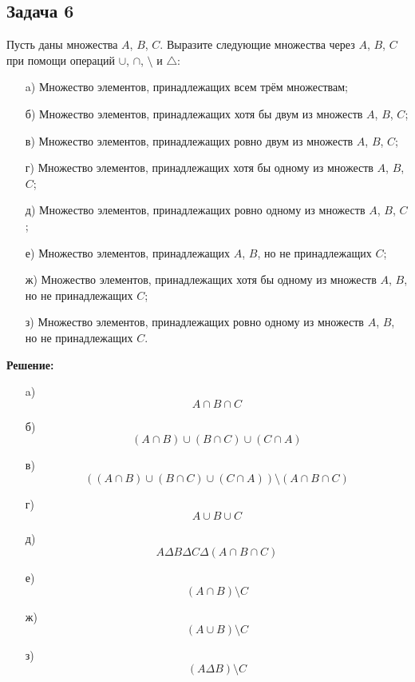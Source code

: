 \documentclass[a4paper,12pt]{article}
\begin{document}
\subsection{Задача 6}
Пусть даны множества \(A\), \(B\), \(C\). Выразите следующие множества через \(A\), \(B\), \(C\) при помощи операций \(\cup\), \(\cap\), \(\setminus\) и \(\triangle\):
\begin{itemize}
    \item[a)] Множество элементов, принадлежащих всем трём множествам;
    \item[б)] Множество элементов, принадлежащих хотя бы двум из множеств \(A\), \(B\), \(C\);
    \item[в)] Множество элементов, принадлежащих ровно двум из множеств \(A\), \(B\), \(C\);
    \item[г)] Множество элементов, принадлежащих хотя бы одному из множеств \(A\), \(B\), \(C\);
    \item[д)] Множество элементов, принадлежащих ровно одному из множеств \(A\), \(B\), \(C\);
    \item[е)] Множество элементов, принадлежащих \(A\), \(B\), но не принадлежащих \(C\);
    \item[ж)] Множество элементов, принадлежащих хотя бы одному из множеств \(A\), \(B\), но не принадлежащих \(C\);
    \item[з)] Множество элементов, принадлежащих ровно одному из множеств \(A\), \(B\), но не принадлежащих \(C\).
\end{itemize}

\textbf{Решение:}
\begin{itemize}
    \item[a)] 
    \[
    A\cap B\cap C
    \]
    
    \item[б)] 
    \[
    (A \cap B) \cup (B \cap C) \cup (C \cap A)
    \]
    
    \item[в)] 
    \[
    ((A \cap B) \cup (B \cap C) \cup (C \cap A)) \setminus (A\cap B\cap C)
    \]
    
    \item[г)] 
    \[
    A\cup B\cup C
    \]
    
    \item[д)] 
    \[
    A \Delta B \Delta C \Delta(A\cap B\cap C)
    \]
    
    \item[е)] 
    \[
    (A\cap B) \setminus C
    \]
    
    \item[ж)] 
    \[
    (A\cup B) \setminus C
    \]
    
    \item[з)] 
    \[
    (A\Delta B) \setminus C
    \]
\end{itemize}
\end{document}
